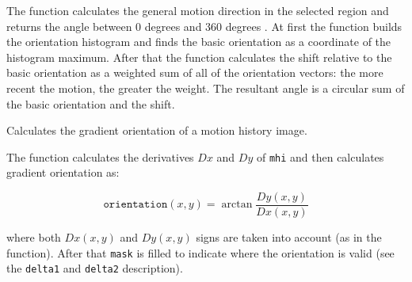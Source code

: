 The function calculates the general
motion direction in the selected region and returns the angle between
0 degrees  and 360 degrees . At first the function builds the orientation histogram
and finds the basic orientation as a coordinate of the histogram
maximum. After that the function calculates the shift relative to the
basic orientation as a weighted sum of all of the orientation vectors: the more
recent the motion, the greater the weight. The resultant angle is
a circular sum of the basic orientation and the shift.

Calculates the gradient orientation of a motion history image.


\begin{description}
\end{description}

The function calculates the derivatives $Dx$ and $Dy$ of \texttt{mhi} and then calculates gradient orientation as:

\[
\texttt{orientation}(x,y)=\arctan{\frac{Dy(x,y)}{Dx(x,y)}}
\]

where both $Dx(x,y)$ and $Dy(x,y)$ signs are taken into account (as in the  function). After that \texttt{mask} is filled to indicate where the orientation is valid (see the \texttt{delta1} and \texttt{delta2} description).

